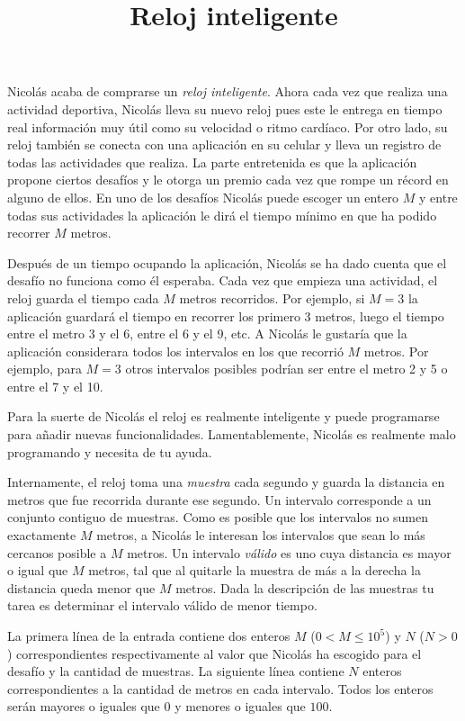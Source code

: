\documentclass{oci}
\title{Reloj inteligente}
\begin{document}
\begin{problemDescription}
  Nicolás acaba de comprarse un \emph{reloj inteligente}.
  Ahora cada vez que realiza una actividad deportiva, Nicolás lleva su nuevo
  reloj pues este le entrega en tiempo real información muy útil como su
  velocidad o ritmo cardíaco.
  Por otro lado, su reloj también se conecta con una aplicación en su celular y
  lleva un registro de todas las actividades que realiza.
  La parte entretenida es que la aplicación propone ciertos desafíos y le otorga
  un premio cada vez que rompe un récord en alguno de ellos.
  En uno de los desafíos Nicolás puede escoger un entero $M$ y entre todas sus
  actividades la aplicación le dirá el tiempo mínimo en que ha podido recorrer
  $M$ metros.

  Después de un tiempo ocupando la aplicación, Nicolás se ha dado cuenta que el
  desafío no funciona como él esperaba.
  Cada vez que empieza una actividad, el reloj guarda el tiempo cada $M$
  metros recorridos.
  Por ejemplo, si $M=3$ la aplicación guardará el tiempo en
  recorrer los primero 3 metros, luego el tiempo entre el metro 3 y
  el 6, entre el 6 y el 9, etc.
  A Nicolás le gustaría que la aplicación considerara todos los intervalos en
  los que recorrió $M$ metros.
  Por ejemplo, para $M=3$ otros intervalos posibles podrían ser entre el
  metro 2 y 5 o entre el 7 y el 10.

  Para la suerte de Nicolás el reloj es realmente inteligente y puede
  programarse para añadir nuevas funcionalidades.
  Lamentablemente, Nicolás es realmente malo programando y necesita de tu ayuda.

  Internamente, el reloj toma una \emph{muestra} cada segundo y guarda la
  distancia en metros que fue recorrida durante ese segundo.
  Un intervalo corresponde a un conjunto contiguo de muestras.
  Como es posible que los intervalos no sumen exactamente $M$ metros, a
  Nicolás le interesan los intervalos que sean lo más cercanos posible a $M$
  metros.
  Un intervalo \emph{válido} es uno cuya distancia es mayor o igual que $M$ metros,
  tal que al quitarle la muestra de más a la derecha la distancia queda menor
  que $M$ metros.
  Dada la descripción de las muestras tu tarea es determinar el intervalo
  válido de menor tiempo.

\end{problemDescription}

\begin{inputDescription}
  La primera línea de la entrada contiene dos enteros $M$ ($0<M\leq 10^5$) y $N$
  ($N > 0$) correspondientes respectivamente al valor que Nicolás ha escogido
  para el desafío y la cantidad de muestras.
  La siguiente línea contiene $N$ enteros correspondientes a la cantidad de
  metros en cada intervalo.
  Todos los enteros serán mayores o iguales que 0 y menores o iguales que $100$.
\end{inputDescription}
\end{document}
